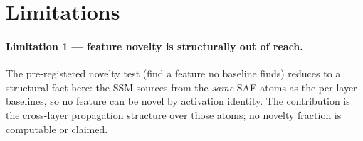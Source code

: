 \section{Limitations}
\label{sec:limitations}

\paragraph{Limitation 1 --- feature novelty is structurally out of reach.}
The pre-registered novelty test (find a feature no baseline finds) reduces to
a structural fact here: the SSM sources from the \emph{same} SAE atoms as the
per-layer baselines, so no feature can be novel by activation identity. The
contribution is the cross-layer propagation structure over those atoms; no
novelty fraction is computable or claimed.

